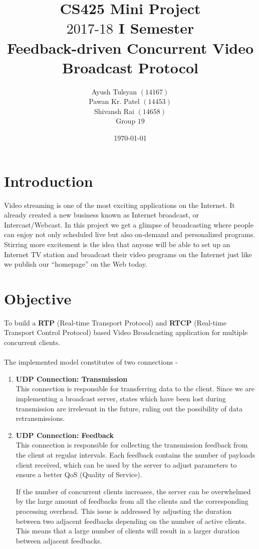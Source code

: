 \documentclass[a4paper]{article}
\title{CS425 Mini Project \\ $2017\text{-}18$  I Semester \\ Feedback-driven Concurrent Video Broadcast Protocol}
\author{Ayush Tulsyan $(14167)$ \\ Pawan Kr. Patel $(14453)$ \\ Shivansh Rai $(14658)$\\ Group $19$}
\date{\today}
\begin{document}
  \maketitle

  \section{Introduction}
    Video streaming is one of the most exciting applications on the Internet. It already created a new business known as Internet
    broadcast, or Intercast/Webcast. In this project we get a glimpse of broadcasting where people can enjoy not only scheduled live
    but also on-demand and personalized programs. Stirring more excitement is the idea that anyone will be able to set up an Internet
    TV station and broadcast their video programs on the Internet just like we publish our “homepage” on the Web today.

  \section{Objective}
    To build a \textbf{RTP} (Real-time Transport Protocol) and \textbf{RTCP} (Real-time Transport Control Protocol) based Video Broadcasting application for multiple concurrent clients. \\\\
    The implemented model constitutes of two connections -
    \begin{enumerate}
      \item \textbf{UDP Connection: Transmission} \\
      This connection is responsible for transferring data to the client. Since we are implementing a broadcast server, states which have been lost during transmission are irrelevant in the future, ruling out the possibility of data retransmissions.
      \item \textbf{UDP Connection: Feedback} \\
      This connection is responsible for collecting the transmission feedback from the client at regular intervals. Each feedback contains the number of payloads client received, which can be used by the server to adjust parameters to ensure a better QoS (Quality of Service). \par
      If the number of concurrent clients increases, the server can be overwhelmed by the large amount of feedbacks from all the clients and the corresponding processing overhead. This issue is addressed by adjusting the duration between two adjacent feedbacks depending on the number of active clients. This means that a large number of clients will result in a larger duration between adjacent feedbacks.
    \end{enumerate}
\end{document}
